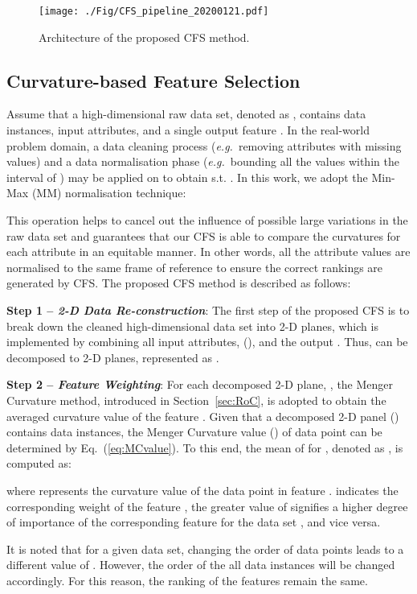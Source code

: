 \documentclass{article}
\newcommand{\zzeg}{\emph{e.g.}~}
\newcommand*{\1}{\textcolor{magenta}}
\begin{document}
	\begin{figure*}[ht]
		\centering
		\texttt{[image: ./Fig/CFS\_pipeline\_20200121.pdf]}
		\caption{Architecture of the proposed CFS method.}\label{fig:pip}
	\end{figure*}
	
	\subsection{Curvature-based Feature Selection}\label{sec:CFS}
	Assume that a high-dimensional raw data set, denoted as , contains  data instances,  input attributes, and a single output feature . In the real-world problem domain, a data cleaning process (\zzeg removing attributes with missing values) and a data normalisation phase (\zzeg bounding all the values within the interval of ) may be applied on  to obtain  s.t. . In this work, we adopt the Min-Max (MM) normalisation technique:
	
	

	This operation helps to cancel out the influence of possible large variations in the raw data set and guarantees that our CFS is able to compare the curvatures for each attribute in an equitable manner. In other words, all the attribute values are normalised to the same frame of reference to ensure the correct rankings are generated by CFS. The proposed CFS method is described as follows:


	\textbf{Step 1 -- \textit{2-D Data Re-construction}}: The first step of the proposed CFS is to break down the cleaned high-dimensional data set  into  2-D planes, which is implemented by combining all input attributes,  (), and the output . Thus,  can be decomposed to  2-D planes, represented as . 
	
	\textbf{Step 2 -- \textit{Feature Weighting}}: For each decomposed 2-D plane, , the Menger Curvature method, introduced in Section~\ref{sec:RoC}, is adopted to obtain the averaged curvature value of the feature . Given that a decomposed 2-D panel () contains  data instances, the Menger Curvature value () of data point   can be determined by Eq.~(\ref{eq:MCvalue}). To this end, the mean of  for , denoted as , is computed as:
	
	where  represents the curvature value of the  data point in feature .  indicates the corresponding weight of the feature , the greater value of  signifies a higher degree of importance of the corresponding feature  for the data set , and vice versa. 
	
	It is noted that for a given data set, changing the order of data points leads to a different value of . However, the order of the all data instances will be changed accordingly. For this reason, the ranking of the features remain the same.
	
\end{document}
